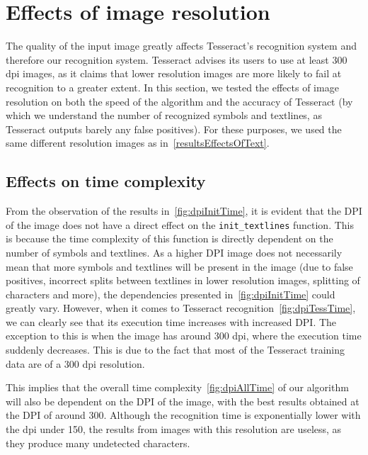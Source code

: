 \section{Effects of image resolution}

The quality of the input image greatly affects Tesseract's recognition system and therefore our recognition system. Tesseract advises its users to use at least 300 dpi images, as it claims that lower resolution images are more likely to fail at recognition to a greater extent. In this section, we tested the effects of image resolution on both the speed of the algorithm and the accuracy of Tesseract (by which we understand the number of recognized symbols and textlines, as Tesseract outputs barely any false positives). For these purposes, we used the same different resolution images as in~\cref{resultsEffectsOfText}.

\subsection{Effects on time complexity}

From the observation of the results in~\cref{fig:dpiInitTime}, it is evident that the DPI of the image does not have a direct effect on the \texttt{init\_textlines} function. This is because the time complexity of this function is directly dependent on the number of symbols and textlines. As a higher DPI image does not necessarily mean that more symbols and textlines will be present in the image (due to false positives, incorrect splits between textlines in lower resolution images, splitting of characters and more), the dependencies presented in~\cref{fig:dpiInitTime} could greatly vary. However, when it comes to Tesseract recognition~\cref{fig:dpiTessTime}, we can clearly see that its execution time increases with increased DPI. The exception to this is when the image has around 300 dpi, where the execution time suddenly decreases. This is due to the fact that most of the Tesseract training data are of a 300 dpi resolution.

This implies that the overall time complexity~\cref{fig:dpiAllTime} of our algorithm will also be dependent on the DPI of the image, with the best results obtained at the DPI of around 300. Although the recognition time is exponentially lower with the dpi under 150, the results from images with this resolution are useless, as they produce many undetected characters.

